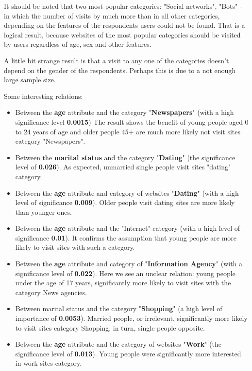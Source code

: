 \documentclass[runningheads,a4paper]{llncs}
\begin{document}
It should be noted that two most popular categories: "Social networks", "Bots" - in which the number of visits by much more than in all other categories, depending on the features of the respondents users could not be found. That is a logical result, because websites of the most popular categories should be visited by users regardless of age, sex and other features. 

A little bit strange result is that a visit to any one of the categories doesn’t depend on the gender of the respondents. Perhaps this is due to a not enough large sample size.

Some interesting relations:

\begin{itemize}
	\item Between the \textbf{age} attribute and the category "\textbf{Newspapers}" (with a high significance level \textbf{0.0015}) The result shows the benefit of young people aged 0 to 24 years of age and older people 45+ are much more likely not visit sites category "Newspapers".
	\item Between the \textbf{marital status} and the category "\textbf{Dating}" (the significance level of \textbf{0.026}). As expected, unmarried single people visit sites "dating" category.
	\item Between the \textbf{age} attribute and category of websites "\textbf{Dating}" (with a high level of significance \textbf{0.009}). Older people visit dating sites are more likely than younger ones.
	\item Between the \textbf{age} attribute and the "Internet" category (with a high level of significance \textbf{0.01}). It confirms the assumption that young people are more likely to visit sites with such a category.
	\item Between the \textbf{age} attribute and category of "\textbf{Information Agency}" (with a significance level of \textbf{0.022}). Here we see an unclear relation: young people under the age of 17 years, significantly more likely to visit sites with the category News agencies.
	\item Between marital status and the category "\textbf{Shopping}" (a high level of importance of \textbf{0.0053}). Married people, or irrelevant, significantly more likely to visit sites category Shopping, in turn, single people opposite.
	\item Between the \textbf{age} attribute and the category of websites "\textbf{Work}" (the significance level of \textbf{0.013}). Young people were significantly more interested in work sites category.

\end{itemize}
\end{document}
